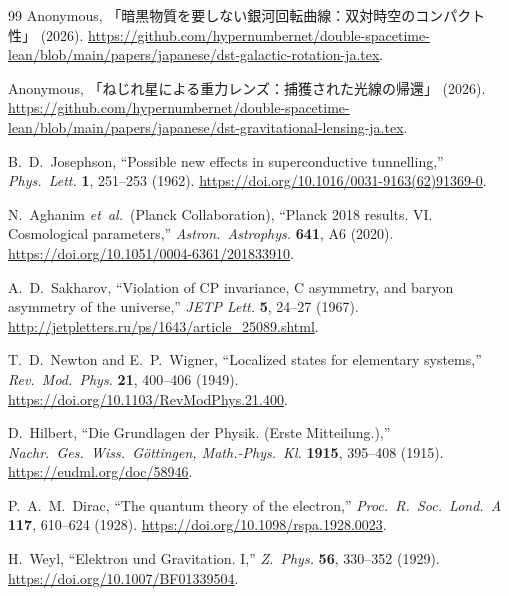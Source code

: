 \documentclass[a4paper]{article}
\begin{document}
\begin{thebibliography}{99}
Anonymous,
「暗黒物質を要しない銀河回転曲線：双対時空のコンパクト性」 (2026).
\url{https://github.com/hypernumbernet/double-spacetime-lean/blob/main/papers/japanese/dst-galactic-rotation-ja.tex}.

Anonymous,
「ねじれ星による重力レンズ：捕獲された光線の帰還」 (2026).
\url{https://github.com/hypernumbernet/double-spacetime-lean/blob/main/papers/japanese/dst-gravitational-lensing-ja.tex}.

B.~D.~Josephson,
``Possible new effects in superconductive tunnelling,''
\textit{Phys.\ Lett.} \textbf{1}, 251--253 (1962).
\url{https://doi.org/10.1016/0031-9163(62)91369-0}.

N.~Aghanim \textit{et~al.}\ (Planck Collaboration),
``Planck 2018 results. VI. Cosmological parameters,''
\textit{Astron.\ Astrophys.} \textbf{641}, A6 (2020).
\url{https://doi.org/10.1051/0004-6361/201833910}.

A.~D.~Sakharov,
``Violation of CP invariance, C asymmetry, and baryon asymmetry of the universe,''
\textit{JETP Lett.} \textbf{5}, 24--27 (1967).
\url{http://jetpletters.ru/ps/1643/article_25089.shtml}.

T.~D.~Newton and E.~P.~Wigner,
``Localized states for elementary systems,''
\textit{Rev.\ Mod.\ Phys.} \textbf{21}, 400--406 (1949).
\url{https://doi.org/10.1103/RevModPhys.21.400}.

D.~Hilbert,
``Die Grundlagen der Physik. (Erste Mitteilung.),''
\textit{Nachr.\ Ges.\ Wiss.\ G\"ottingen, Math.-Phys.\ Kl.} \textbf{1915}, 395--408 (1915).
\url{https://eudml.org/doc/58946}.

P.~A.~M.~Dirac,
``The quantum theory of the electron,''
\textit{Proc.\ R.\ Soc.\ Lond.\ A} \textbf{117}, 610--624 (1928).
\url{https://doi.org/10.1098/rspa.1928.0023}.

H.~Weyl,
``Elektron und Gravitation. I,''
\textit{Z.\ Phys.} \textbf{56}, 330--352 (1929).
\url{https://doi.org/10.1007/BF01339504}.

\end{thebibliography}
\end{document}
